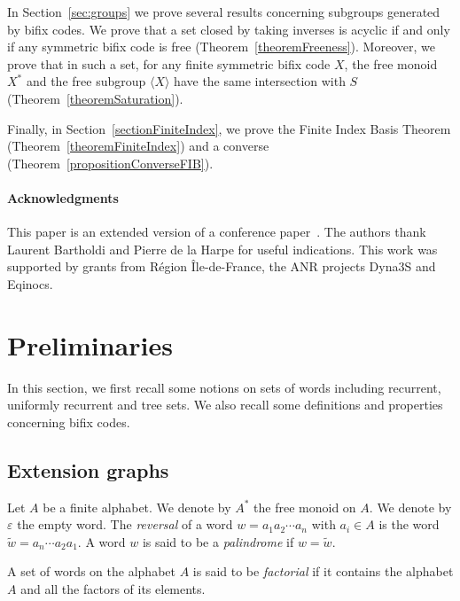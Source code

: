 \documentclass[preprint,12pt]{elsarticle}
\numberwithin{theorem}{section}
\numberwithin{equation}{section}
\numberwithin{figure}{section}
\numberwithin{table}{section}
\begin{document}
In Section~\ref{sec:groups} we prove several results concerning subgroups generated by bifix codes.
We prove that a set closed by taking inverses is acyclic if and only if any symmetric bifix code is free (Theorem~\ref{theoremFreeness}).
Moreover, we prove that in such a set, for any finite symmetric bifix code $X$, the free monoid $X^*$ and the free subgroup $\langle X \rangle$ have the same intersection with $S$ (Theorem~\ref{theoremSaturation}).

Finally, in Section~\ref{sectionFiniteIndex}, we prove the Finite Index Basis Theorem (Theorem~\ref{theoremFiniteIndex}) and a converse (Theorem~\ref{propositionConverseFIB}).





\paragraph{Acknowledgments}
This paper is an extended version of a conference paper~\cite{words2015}.
The authors thank  Laurent Bartholdi and Pierre de la Harpe for useful indications.
This work was supported by grants from R\'egion \^{I}le-de-France, the ANR projects Dyna3S and Eqinocs.










\section{Preliminaries}
\label{sectionPreliminaries}
In this section, we first recall some notions on sets of words including recurrent, uniformly recurrent and tree sets.
We also recall some definitions and properties concerning bifix codes.





\subsection{Extension graphs}
Let $A$ be a finite alphabet.
We denote by $A^*$ the free monoid on $A$.
We denote by $\varepsilon$ the empty word.
The \emph{reversal} of a word $w=a_1a_2\cdots a_n$ with $a_i\in A$ is the word $\tilde{w} = a_n\cdots a_2a_1$.
A word $w$ is said to be a \emph{palindrome} if $w = \tilde{w}$.

A set of words on the alphabet $A$ is said to be \emph{factorial} if it contains the alphabet $A$ and all the factors of its elements. 
\end{document}
